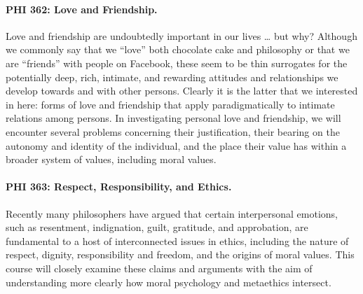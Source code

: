 \documentclass[%
  11pt,%
]{article}
\begin{document}
\paragraph{PHI 362: Love and Friendship.}

Love and friendship are undoubtedly important in our lives \dots{} but why? Although we commonly say that we \enquote{love} both chocolate cake and philosophy or that we are \enquote{friends} with people on Facebook, these seem to be thin surrogates for the potentially deep, rich, intimate, and rewarding attitudes and relationships we develop towards and with other persons. Clearly it is the latter that we interested in here: forms of love and friendship that apply paradigmatically to intimate relations among persons. In investigating personal love and friendship, we will encounter several problems concerning their justification, their bearing on the autonomy and identity of the individual, and the place their value has within a broader system of values, including moral values.

\paragraph{PHI 363: Respect, Responsibility, and Ethics.}

Recently many philosophers have argued that certain interpersonal emotions, such as resentment, indignation, guilt, gratitude, and approbation, are fundamental to a host of interconnected issues in ethics, including the nature of respect, dignity, responsibility and freedom, and the origins of moral values. This course will closely examine these claims and arguments with the aim of understanding more clearly how moral psychology and metaethics intersect.

\ifdefined\HCode
\fi
\end{document}
